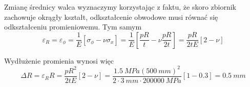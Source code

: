 \documentclass[a4paper,11pt]{article}
\begin{document}
Zmianę średnicy walca wyznaczymy korzystając z faktu, że skoro zbiornik zachowuje okrągły kształt, odkształcenie obwodowe musi równać się odkształceniu promieniowemu. Tym samym
\[\varepsilon_R = \varepsilon_{\phi} = \frac{1}{E} \left[\sigma_{\phi}-\nu\sigma_x\right] = \frac{1}{E} \left[\frac{pR}{t}-\nu\frac{pR}{2t}\right] = \frac{pR}{2tE}[2-\nu] \]

Wydłużenie promienia wynosi więc
\[ \Delta R = \varepsilon_R R = \frac{pR^2}{2tE}[2-\nu] = \frac{\SI{1.5}{MPa}(\SI{500}{mm})^2}{2\cdot \SI{3}{mm}\cdot \SI{200000}{MPa}}[1-0.3] = \SI{0.5}{mm} \]
\end{document}
